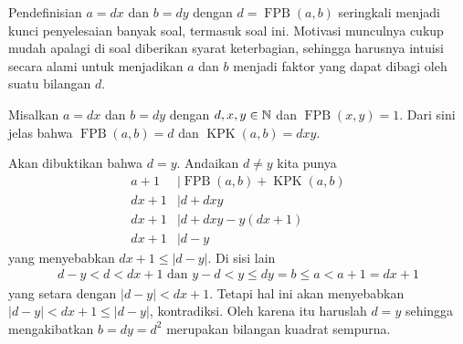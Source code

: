 
\newline

\begin{motivasi}
    Pendefinisian $a=dx$ dan $b=dy$ dengan $d=\operatorname{FPB}(a,b)$ seringkali menjadi kunci penyelesaian banyak soal, termasuk soal ini. Motivasi munculnya cukup mudah apalagi di soal diberikan syarat keterbagian, sehingga harusnya intuisi secara alami untuk menjadikan $a$ dan $b$ menjadi faktor yang dapat dibagi oleh suatu bilangan $d$.
\end{motivasi}
\begin{solusi}
    Misalkan $a=dx$ dan $b=dy$ dengan $d,x,y \in \mathbb N$ dan $\operatorname{FPB}(x,y)=1$. Dari sini jelas bahwa $\operatorname{FPB}(a,b)=d$ dan $\operatorname{KPK}(a,b) = dxy$.

    Akan dibuktikan bahwa $d=y$. Andaikan $d \neq y$ kita punya
    \begin{align*}
        a+ 1 &\mid \operatorname{FPB}(a, b)+\operatorname{KPK}(a, b)\\
        dx+1 &\mid d+dxy\\
        dx+1 &\mid d+dxy - y(dx+1)\\
        dx+1 &\mid d-y
    \end{align*}
    yang menyebabkan $dx+1 \le |d-y|$.
    Di sisi lain
    \begin{align*}
        d-y < d < dx + 1 \text{ dan } y-d < y \le dy = b \le a < a+1 = dx+1
    \end{align*}
    yang setara dengan $|d-y| < dx+1$. Tetapi hal ini akan menyebabkan $|d-y| < dx+1 \le |d-y|$, kontradiksi. Oleh karena itu haruslah $d=y$ sehingga mengakibatkan $b=dy=d^2$ merupakan bilangan kuadrat sempurna.
\end{solusi}